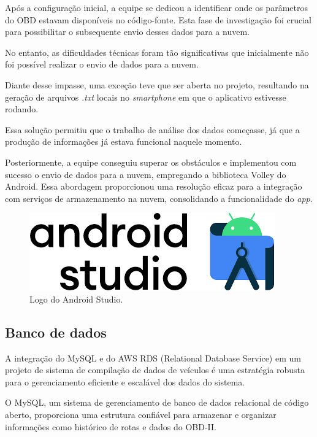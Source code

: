     Após a configuração inicial, a equipe se dedicou a identificar onde os parâmetros do OBD estavam disponíveis no código-fonte. Esta fase de investigação foi crucial para possibilitar o subsequente envio desses dados para a nuvem.

    No entanto, as dificuldades técnicas foram tão significativas que inicialmente não foi possível realizar o envio de dados para a nuvem. 
    
    Diante desse impasse, uma exceção teve que ser aberta no projeto, resultando na geração de arquivos \textit{.txt} locais no \textit{smartphone} em que o aplicativo estivesse rodando. 
    
    Essa solução permitiu que o trabalho de análise dos dados começasse, já que a produção de informações já estava funcional naquele momento.
    
    Posteriormente, a equipe conseguiu superar os obstáculos e implementou com sucesso o envio de dados para a nuvem, empregando a biblioteca Volley do Android. Essa abordagem proporcionou uma resolução eficaz para a integração com serviços de armazenamento na nuvem, consolidando a funcionalidade do \textit{app}. 

     \begin{figure}[hp]
    \centering
    
    \includegraphics[scale=0.4]{figures/logo_android.png}
    
    \caption{Logo do Android Studio.}
    
\end{figure}
    
    \subsection{Banco de dados} 
    A integração do MySQL e do AWS RDS (Relational Database Service) em um projeto de sistema de compilação de dados de veículos é uma estratégia robusta para o gerenciamento eficiente e escalável dos dados do sistema. 
    
    O MySQL, um sistema de gerenciamento de banco de dados relacional de código aberto, proporciona uma estrutura confiável para armazenar e organizar informações como histórico de rotas e dados do OBD-II. 
     
